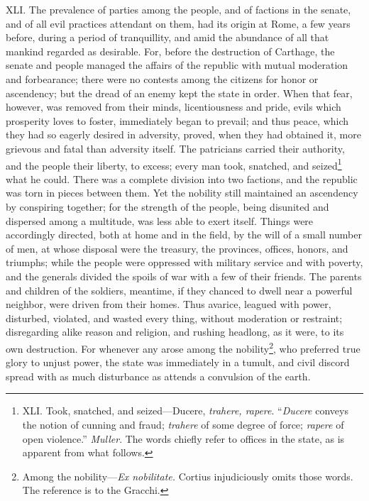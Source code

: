 XLI. The prevalence of parties among the people, and of factions in
the senate, and of all evil practices attendant on them, had its
origin at Rome, a few years before, during a period of tranquillity,
and amid the abundance of all that mankind regarded as desirable. For,
before the destruction of Carthage, the senate and people managed the
affairs of the republic with mutual moderation and forbearance; there
were no contests among the citizens for honor or ascendency; but the
dread of an enemy kept the state in order. When that fear, however,
was removed from their minds, licentiousness and pride, evils which
prosperity loves to foster, immediately began to prevail; and thus
peace, which they had so eagerly desired in adversity, proved, when
they had obtained it, more grievous and fatal than adversity itself.
The patricians carried their authority, and the people their liberty,
to excess; every man took, snatched, and seized\footnote{XLI. Took, snatched, and seized—Ducere, \emph{trahere, rapere}.
``\emph{Ducere} conveys the notion of cunning and fraud; \emph{trahere} of some
degree of force; \emph{rapere} of open violence.'' \emph{Muller}. The words chiefly
refer to offices in the state, as is apparent from what follows.} what he could.
There was a complete division into two factions, and the republic was
torn in pieces between them. Yet the nobility still maintained an
ascendency by conspiring together; for the strength of the people,
being disunited and dispersed among a multitude, was less able to
exert itself. Things were accordingly directed, both at home and in
the field, by the will of a small number of men, at whose disposal
were the treasury, the provinces, offices, honors, and triumphs; while
the people were oppressed with military service and with poverty, and
the generals divided the spoils of war with a few of their friends.
The parents and children of the soldiers, meantime, if they
chanced to dwell near a powerful neighbor, were driven from their
homes. Thus avarice, leagued with power, disturbed, violated, and
wasted every thing, without moderation or restraint; disregarding
alike reason and religion, and rushing headlong, as it were, to its
own destruction. For whenever any arose among the nobility\footnote{Among the nobility—\emph{Ex nobilitate.} Cortius injudiciously
omits those words. The reference is to the Gracchi.}, who
preferred true glory to unjust power, the state was immediately in a
tumult, and civil discord spread with as much disturbance as attends a
convulsion of the earth.

